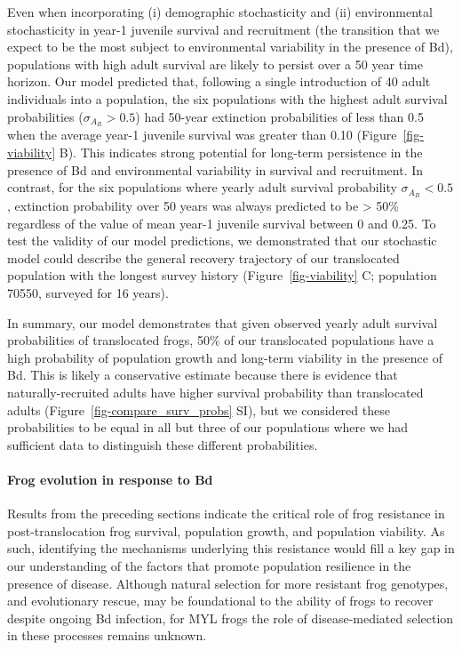 \documentclass[
  letterpaper,
  DIV=11,
  numbers=noendperiod]{scrartcl}
\let\oldparagraph\paragraph
\renewcommand{\paragraph}[1]{\oldparagraph{#1}\mbox{}}
\begin{document}
Even when incorporating (i) demographic stochasticity and (ii)
environmental stochasticity in year-1 juvenile survival and recruitment
(the transition that we expect to be the most subject to environmental
variability in the presence of Bd), populations with high adult survival
are likely to persist over a 50 year time horizon. Our model predicted
that, following a single introduction of 40 adult individuals into a
population, the six populations with the highest adult survival
probabilities (\(\sigma_{A_R} > 0.5\)) had 50-year extinction
probabilities of less than 0.5 when the average year-1 juvenile survival
was greater than 0.10 (Figure~\ref{fig-viability} B). This indicates
strong potential for long-term persistence in the presence of Bd and
environmental variability in survival and recruitment. In contrast, for
the six populations where yearly adult survival probability
\(\sigma_{A_R} < 0.5\), extinction probability over 50 years was always
predicted to be \textgreater{} 50\% regardless of the value of mean
year-1 juvenile survival between 0 and 0.25. To test the validity of our
model predictions, we demonstrated that our stochastic model could
describe the general recovery trajectory of our translocated population
with the longest survey history (Figure~\ref{fig-viability} C;
population 70550, surveyed for 16 years).

In summary, our model demonstrates that given observed yearly adult
survival probabilities of translocated frogs, 50\% of our translocated
populations have a high probability of population growth and long-term
viability in the presence of Bd. This is likely a conservative estimate
because there is evidence that naturally-recruited adults have higher
survival probability than translocated adults
(Figure~\ref{fig-compare_surv_probs} SI), but we considered these
probabilities to be equal in all but three of our populations where we
had sufficient data to distinguish these different probabilities.

\hypertarget{frog-evolution-in-response-to-bd}{%
\paragraph{Frog evolution in response to
Bd}\label{frog-evolution-in-response-to-bd}}

Results from the preceding sections indicate the critical role of frog
resistance in post-translocation frog survival, population growth, and
population viability. As such, identifying the mechanisms underlying
this resistance would fill a key gap in our understanding of the factors
that promote population resilience in the presence of disease. Although
natural selection for more resistant frog genotypes, and evolutionary
rescue, may be foundational to the ability of frogs to recover despite
ongoing Bd infection, for MYL frogs the role of disease-mediated
selection in these processes remains unknown.
\end{document}
